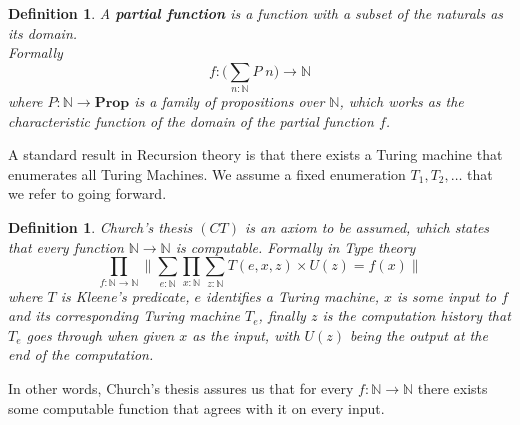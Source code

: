 \documentclass[12pt]{report}
\newtheorem{defn}[thm]{Definition}
\begin{document}
\begin{defn}
A \textbf{partial function} is a function with a subset of the naturals as its domain.\\
Formally 
$$f : \Big(\sum_{n : \mathbb{N}} P\; n \Big) \rightarrow \mathbb{N}$$
where $P : \mathbb{N} \rightarrow \mathbf{Prop}$ is a family of propositions over $\mathbb{N}$, which works as the characteristic function of the domain of the partial function $f$.
\end{defn}

A standard result in Recursion theory is that there exists a Turing machine that enumerates all Turing Machines. 
We assume a fixed enumeration $T_1, T_2,\ldots $ that we refer to going forward. 

\begin{defn}\label{CT}
Church's thesis $(CT)$ is an axiom to be assumed, which states that every function $\mathbb{N}\rightarrow \mathbb{N}$ is computable. 
Formally in Type theory
$$\prod_{f : \mathbb{N}\rightarrow \mathbb{N}} \Big\lVert \sum_{e : \mathbb{N}} \prod_{x : \mathbb{N}} \sum_{z : \mathbb{N}} T(e,x,z) \times U(z) = f(x) \Big\rVert$$
where $T$ is Kleene's predicate, $e$ identifies a Turing machine, $x$ is some input to $f$ and its corresponding Turing machine $T_e$, finally $z$ is the computation history that $T_e$ goes through when given $x$ as the input, with $U(z)$ being the output at the end of the computation.
\end{defn}

In other words, Church's thesis assures us that for every $f : \mathbb{N} \rightarrow \mathbb{N}$ there exists some computable function that agrees with it on every input.
\end{document}
